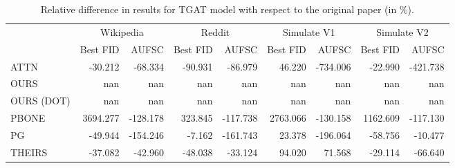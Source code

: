 \begin{table}
\centering
\begin{tabular}{lrrrrrrrr}
\toprule
 & \multicolumn{2}{c}{Wikipedia} & \multicolumn{2}{c}{Reddit} & \multicolumn{2}{c}{Simulate V1} & \multicolumn{2}{c}{Simulate V2} \\
 & Best FID & AUFSC & Best FID & AUFSC & Best FID & AUFSC & Best FID & AUFSC \\
\midrule
ATTN & -30.212 & -68.334 & -90.931 & -86.979 & 46.220 & -734.006 & -22.990 & -421.738 \\
OURS & nan & nan & nan & nan & nan & nan & nan & nan \\
OURS (DOT) & nan & nan & nan & nan & nan & nan & nan & nan \\
PBONE & 3694.277 & -128.178 & 323.845 & -117.738 & 2763.066 & -130.158 & 1162.609 & -117.130 \\
PG & -49.944 & -154.246 & -7.162 & -161.743 & 23.378 & -196.064 & -58.756 & -10.477 \\
THEIRS & -37.082 & -42.960 & -48.038 & -33.124 & 94.020 & 71.568 & -29.114 & -66.640 \\
\bottomrule
\end{tabular}
\caption{\label{tab:tgat_results_diff}Relative difference in results for TGAT model with respect to the original paper (in \%).}
\end{table}
